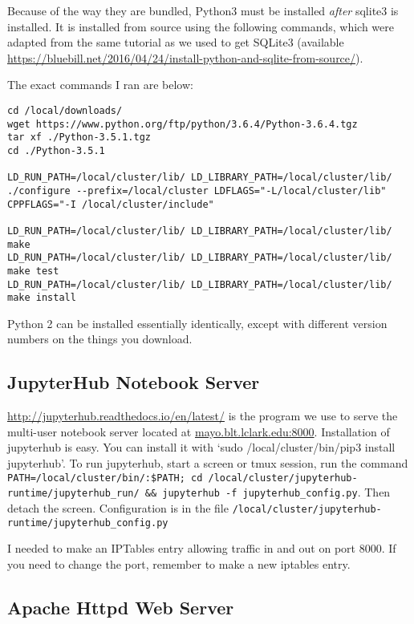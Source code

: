 \documentclass[]{book}
\theoremstyle{definition}
\theoremstyle{definition}
\theoremstyle{definition}
\theoremstyle{remark}
\begin{document}
Because of the way they are bundled, Python3 must be installed
\emph{after} sqlite3 is installed. It is installed from source using the
following commands, which were adapted from the same tutorial as we used
to get SQLite3 (available
\href{Here}{https://bluebill.net/2016/04/24/install-python-and-sqlite-from-source/}).

The exact commands I ran are below:

\begin{verbatim}
cd /local/downloads/
wget https://www.python.org/ftp/python/3.6.4/Python-3.6.4.tgz
tar xf ./Python-3.5.1.tgz
cd ./Python-3.5.1

LD_RUN_PATH=/local/cluster/lib/ LD_LIBRARY_PATH=/local/cluster/lib/ ./configure --prefix=/local/cluster LDFLAGS="-L/local/cluster/lib" CPPFLAGS="-I /local/cluster/include"

LD_RUN_PATH=/local/cluster/lib/ LD_LIBRARY_PATH=/local/cluster/lib/ make
LD_RUN_PATH=/local/cluster/lib/ LD_LIBRARY_PATH=/local/cluster/lib/ make test
LD_RUN_PATH=/local/cluster/lib/ LD_LIBRARY_PATH=/local/cluster/lib/ make install
\end{verbatim}

Python 2 can be installed essentially identically, except with different
version numbers on the things you download.

\subsection{JupyterHub Notebook
Server}\label{jupyterhub-notebook-server}

\href{Jupyterhub}{http://jupyterhub.readthedocs.io/en/latest/} is the
program we use to serve the multi-user notebook server located at
\url{mayo.blt.lclark.edu:8000}. Installation of jupyterhub is easy. You
can install it with `sudo /local/cluster/bin/pip3 install jupyterhub'.
To run jupyterhub, start a screen or tmux session, run the command
\texttt{PATH=/local/cluster/bin/:\$PATH;\ cd\ /local/cluster/jupyterhub-runtime/jupyterhub\_run/\ \&\&\ jupyterhub\ -f\ jupyterhub\_config.py}.
Then detach the screen. Configuration is in the file
\texttt{/local/cluster/jupyterhub-runtime/jupyterhub\_config.py}

I needed to make an IPTables entry allowing traffic in and out on port
8000. If you need to change the port, remember to make a new iptables
entry.

\subsection{Apache Httpd Web Server}\label{apache-httpd-web-server}
\end{document}
